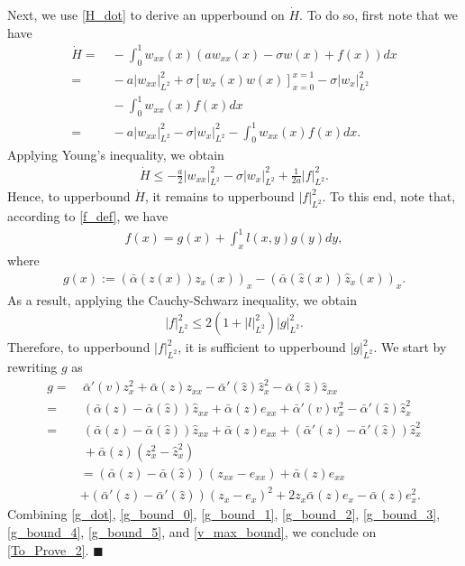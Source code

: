 \documentclass[twocolumn]{autart}
\newenvironment{proof}{{\it Proof. }}{\hfill $\blacksquare$ }
\begin{document}
\begin{proof}
Next, we use \eqref{H_dot} to derive an upperbound on $\dot{H}$. To do so, first note that we have 
\begin{align*}
\dot{H} =&~ - \int_{0}^{1}w_{xx}(x)\left(aw_{xx}(x)-\sigma w(x)+f(x)\right)dx \\
=&~ - a|w_{xx}|_{L^2}^2 + \sigma \left[w_x(x)w(x) \right]_{x=0}^{x=1}-\sigma |w_x|_{L^2}^2 \nonumber \\
&~-\int_{0}^{1}w_{xx}(x)f(x)dx \\
=&~ - a |w_{xx}|_{L^2}^2-\sigma |w_x|_{L^2}^2-\int_{0}^{1}w_{xx}(x)f(x)dx. 
\end{align*}
Applying Young's inequality, we obtain 
\begin{align}
\dot{H} \leq - \frac{a}{2}|w_{xx}|_{L^2}^2-\sigma |w_x|_{L^2}^2 + \frac{1}{2a}|f|_{L^2}^2. \label{g_dot}
\end{align}
Hence, to upperbound $\dot{H}$, it remains to upperbound $|f|_{L^2}^2$. To this end, note that, according to \eqref{f_def}, we have 
\begin{align*}
f(x) = g(x) + \int_{x}^{1}l(x,y)g(y)dy, 
\end{align*}
where 
\begin{align*}
g(x) := (\bar{\alpha}(z(x))z_x(x))_x-(\bar{\alpha}(\hat{z}(x))\hat{z}_x(x))_x. 
\end{align*}
As a result, applying the Cauchy-Schwarz inequality, we obtain  
\begin{align}
|f|_{L^2}^2 \leq 2\left(1+|l|_{L^2}^2\right)|g|_{L^2}^2. \label{g_bound_0}
\end{align}
Therefore, to upperbound $|f|_{L^2}^2$, it is sufficient to upperbound $|g|_{L^2}^2$. We start by rewriting $g$ as 
\begin{align*}
g =&~ \bar{\alpha}'(v)z_x^2+\bar{\alpha}(z)z_{xx}-\bar{\alpha}'(\hat{z})\hat{z}_x^2-\bar{\alpha}(\hat{z})\hat{z}_{xx}\\
=&~ \left(\bar{\alpha}(z)-\bar{\alpha}(\hat{z})\right)\hat{z}_{xx}+\bar{\alpha}(z)e_{xx} + \bar{\alpha}'(v)v_{x}^2-\bar{\alpha}'(\hat{z})\hat{z}_x^2 \\
=&~ \left(\bar{\alpha}(z)-\bar{\alpha}(\hat{z})\right)\hat{z}_{xx}+\bar{\alpha}(z)e_{xx}+\left( \bar{\alpha}'(z)-\bar{\alpha}'(\hat{z})\right)\hat{z}_x^2 \\
&~+\bar{\alpha}(z)(z_x^2-\hat{z}_x^2) \\
&=\left(\bar{\alpha}(z)-\bar{\alpha}(\hat{z})\right)\left(z_{xx}-e_{xx}\right)+\bar{\alpha}(z)e_{xx}\\
&+\left( \bar{\alpha}'(z)-\bar{\alpha}'(\hat{z})\right)\left(z_x-e_x\right)^2 +2z_x\bar{\alpha}(z)e_x-\bar{\alpha}(z)e_x^2.
\end{align*}
Combining \eqref{g_dot}, \eqref{g_bound_0}, \eqref{g_bound_1}, \eqref{g_bound_2}, \eqref{g_bound_3}, \eqref{g_bound_4}, \eqref{g_bound_5}, and \eqref{v_max_bound}, we conclude on \eqref{To_Prove_2}.  
\end{proof}
\end{document}
